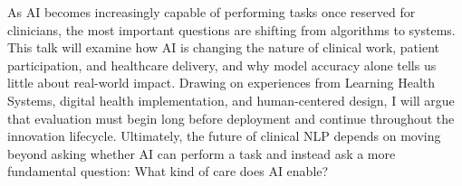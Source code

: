 As AI becomes increasingly capable of performing tasks once reserved for clinicians, the most important questions are shifting from algorithms to systems. This talk will examine how AI is changing the nature of clinical work, patient participation, and healthcare delivery, and why model accuracy alone tells us little about real-world impact. Drawing on experiences from Learning Health Systems, digital health implementation, and human-centered design, I will argue that evaluation must begin long before deployment and continue throughout the innovation lifecycle. Ultimately, the future of clinical NLP depends on moving beyond asking whether AI can perform a task and instead ask a more fundamental question: What kind of care does AI enable?